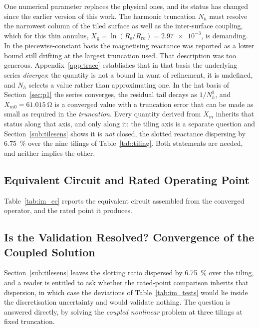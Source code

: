 \documentclass[10pt,a4paper,twocolumn]{article}
\newcommand{\Rs}{R_{\mathrm{s}}}
\newcommand{\Rro}{R_{\mathrm{ro}}}
\newcommand{\Xg}{X_{\mathrm{g}}}
\theoremstyle{plain}
\theoremstyle{remark}
\begin{document}
One numerical parameter replaces the physical ones, and its status has
changed since the earlier version of this work. The harmonic truncation
$N_h$ must resolve the narrowest column of the tiled surface as well as
the inter-surface coupling, which for this thin annulus, $\Xg=\ln(\Rs/\Rro)
=\num{2.97e-3}$, is demanding. In the piecewise-constant basis the
magnetising reactance was reported as a lower bound still drifting at
the largest truncation used. That description was too generous. Appendix~\ref{app:trace} establishes that in that basis the underlying
series \emph{diverges}: the quantity is not a bound in want of refinement, it
is undefined, and $N_h$ selects a value rather than approximating one.
In the hat basis of Section~\ref{sec:p1} the series converges, the
residual tail decays as $1/N_h^{2}$, and $X_{m0}=\SI{61.015}{\ohm}$ is a
converged value with a truncation error that can be made as small as
required in the \emph{truncation}. Every quantity derived from $X_{m}$
inherits that status along that axis, and only along it: the tiling axis
is a separate question and Section~\ref{sub:tilesens} shows it is
\emph{not} closed, the slotted reactance dispersing by
\SI{6.75}{\percent} over the nine tilings of Table~\ref{tab:tiling}.
Both statements are needed, and neither implies the other.


\subsection{Equivalent Circuit and Rated Operating Point}
\label{sub:im_ec}

Table~\ref{tab:im_ec} reports the equivalent circuit assembled from the
converged operator, and the rated point it produces.


\subsection{Is the Validation Resolved? Convergence of the Coupled Solution}
\label{sub:im_coupled}

Section~\ref{sub:tilesens} leaves the slotting ratio dispersed by
\SI{6.75}{\percent} over the tiling, and a reader is entitled to ask
whether the rated-point comparison inherits that dispersion, in which
case the deviations of Table~\ref{tab:im_tests} would lie inside the
discretisation uncertainty and would validate nothing. The question is
answered directly, by solving the \emph{coupled nonlinear} problem at
three tilings at fixed truncation.
\end{document}

